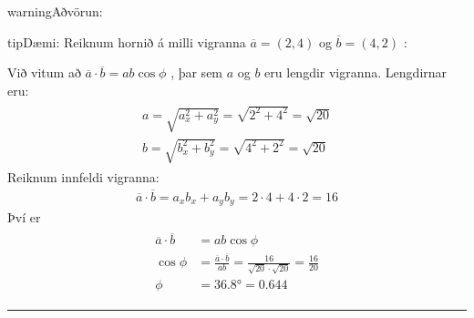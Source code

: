 \documentclass[a4paper,10pt,icelandic]{sphinxmanual}
\begin{document}
\begin{sphinxadmonition}{warning}{Aðvörun:}
\end{sphinxadmonition}

\begin{sphinxadmonition}{tip}{Dæmi:}
Reiknum hornið á milli vigranna \(\overline{a}=(2,4)\) og \(\overline{b}=(4,2)\) :

\begin{figure}[H]
\centering

\noindent{}
\end{figure}


Við vitum að \(\overline{a} \cdot \overline{b} = a b \cos{\phi}\) , þar sem \(a\) og \(b\) eru lengdir vigranna.
Lengdirnar eru:
\begin{equation*}
\begin{split}\begin{aligned}
  a = \sqrt{a_x^2 + a_y^2} = \sqrt{2^2 + 4^2} = \sqrt{20} \\
  b = \sqrt{b_x^2 + b_y^2} = \sqrt{4^2 + 2^2} = \sqrt{20}
\end{aligned}\end{split}
\end{equation*}
Reiknum innfeldi vigranna:
\begin{equation*}
\begin{split}\overline{a} \cdot \overline{b} = a_x b_x + a_y b_y = 2\cdot 4+ 4\cdot 2 = 16\end{split}
\end{equation*}
Því er
\begin{equation*}
\begin{split}\begin{aligned}
  \overline{a} \cdot \overline{b} &= a b \cos{\phi} \\
  \cos{\phi} &= \frac{\overline{a} \cdot \overline{b}}{a b} = \frac{16}{\sqrt{20} \cdot \sqrt{20}} = \frac{16}{20}\\
  \phi &= 36.8 ° = 0.644
\end{aligned}\end{split}
\end{equation*}\end{sphinxadmonition}


\bigskip\hrule\bigskip
\end{document}

